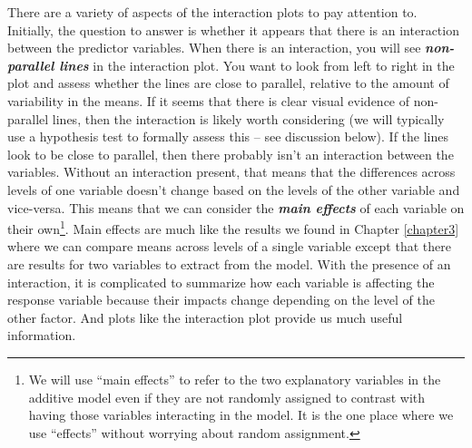 \documentclass[]{book}
\let\rmarkdownfootnote\footnote%
\def\footnote{\protect\rmarkdownfootnote}
\theoremstyle{definition}
\theoremstyle{definition}
\theoremstyle{remark}
\begin{document}
There are a variety of aspects of the interaction plots to pay attention
to. Initially, the question to answer is whether it appears that there
is an interaction between the predictor variables. When there is an
interaction, you will see \textbf{\emph{non-parallel lines}} in the
interaction plot. You want to look from left to right in the plot and
assess whether the lines are close to parallel, relative to the amount
of variability in the means. If it seems that there is clear visual
evidence of non-parallel lines, then the interaction is likely worth
considering (we will typically use a hypothesis test to formally assess
this -- see discussion below). If the lines look to be close to
parallel, then there probably isn't an interaction between the
variables. Without an interaction present, that means that the
differences across levels of one variable doesn't change based on the
levels of the other variable and vice-versa. This means that we can
consider the \textbf{\emph{main effects}} of each variable on their
own\footnote{We will use ``main effects'' to refer to the two
  explanatory variables in the additive model even if they are not
  randomly assigned to contrast with having those variables interacting
  in the model. It is the one place where we use ``effects'' without
  worrying about random assignment.}. Main effects are much like the
results we found in Chapter \ref{chapter3} where we can compare means
across levels of a single variable except that there are results for two
variables to extract from the model. With the presence of an
interaction, it is complicated to summarize how each variable is
affecting the response variable because their impacts change depending
on the level of the other factor. And plots like the interaction plot
provide us much useful information.
\end{document}
